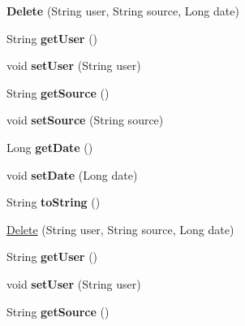 \begin{DoxyCompactItemize}
\item 
\mbox{\label{class_delete_acb6bc707d28650bdeb2283f87630e0b6}} 
{\bfseries Delete} (String user, String source, Long date)
\item 
\mbox{\label{class_delete_a127124607f6d882f87a4deabc2a95e33}} 
String {\bfseries get\+User} ()
\item 
\mbox{\label{class_delete_a1154a1eb8b05320cf686691cd727dc50}} 
void {\bfseries set\+User} (String user)
\item 
\mbox{\label{class_delete_acc45fccf90716ebcd88990f0c6c36d43}} 
String {\bfseries get\+Source} ()
\item 
\mbox{\label{class_delete_a2bddae4762dd4231ab53ee8b2409130b}} 
void {\bfseries set\+Source} (String source)
\item 
\mbox{\label{class_delete_a65c0b139726126a7c0a0bfef168bbe84}} 
Long {\bfseries get\+Date} ()
\item 
\mbox{\label{class_delete_ae1062b901bae5ee6d6722448a12af7aa}} 
void {\bfseries set\+Date} (Long date)
\item 
\mbox{\label{class_delete_ab39433411917f38404d915307d826600}} 
String {\bfseries to\+String} ()
\item 
\hyperlink{class_delete_acb6bc707d28650bdeb2283f87630e0b6}{Delete} (String user, String source, Long date)
\item 
\mbox{\label{class_delete_a127124607f6d882f87a4deabc2a95e33}} 
String {\bfseries get\+User} ()
\item 
\mbox{\label{class_delete_a1154a1eb8b05320cf686691cd727dc50}} 
void {\bfseries set\+User} (String user)
\item 
\mbox{\label{class_delete_acc45fccf90716ebcd88990f0c6c36d43}} 
String {\bfseries get\+Source} ()
\item 
\mbox{\label{class_delete_a2bddae4762dd4231ab53ee8b2409130b}} 

\end{DoxyCompactItemize}
